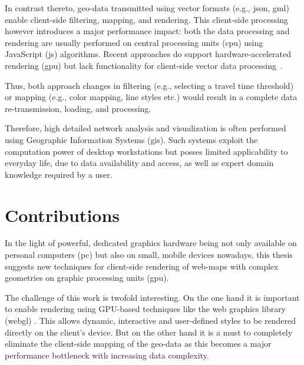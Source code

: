     In contrast thereto, geo-data transmitted using vector formats
    (e.g., \acrshort{json}, \acrshort{gml}) enable
    client-side filtering, mapping, and rendering. This client-side processing
    however introduces a major performance impact: both the data processing and
    rendering are usually performed on central processing units (\acrshort{cpu})
    using JavaScript (\acrshort{js}) algorithms. Recent approaches do support
    hardware-accelerated rendering (\acrshort{gpu}) but lack functionality for
    client-side vector data processing~\cite{Gaffuri2012}.\par

    Thus, both approach changes in filtering (e.g., selecting a travel time
    threshold) or mapping (e.g., color mapping, line styles etc.) would result
    in a complete data re-transmission, loading, and processing.\par

    Therefore, high detailed network analysis and visualization is often
    performed using Geographic Information Systems (\acrshort{gis}). Such
    systems
    exploit the computation power of desktop workstations but posses limited
    applicability to everyday life, due to data availability and access, as well
    as expert domain knowledge required by a user.\par

  \section{Contributions}
    \label{sec:intro:contr}

    In the light of powerful, dedicated graphics hardware being not only
    available on personal computers (\acrshort{pc}) but also
    on small, mobile devices nowadays, this thesis suggests new techniques for
    client-side rendering of web-maps with complex geometries on graphic
    processing units (\acrshort{gpu}).\par

    The challenge of this work is twofold interesting. On the one hand it is
    important to enable rendering using GPU-based techniques like
    the web graphics library (\acrshort{webgl}) \cite{Jackson2016}.
    This allows dynamic, interactive and user-defined styles to be rendered
    directly on the client's device. But on the other hand it is a must to
    completely eliminate the client-side mapping of the geo-data as this becomes
    a major performance bottleneck with increasing data complexity.\par

